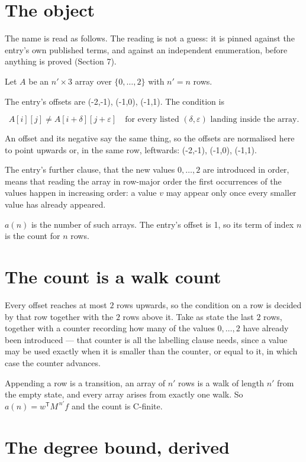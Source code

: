\documentclass[11pt]{article}
\theoremstyle{definition}
\begin{document}
\section{The object}

The name is read as follows. The reading is not a guess: it is pinned against the entry's own published terms, and against an independent enumeration, before anything is proved (Section 7).

Let $A$ be an $n' \times 3$ array over $\{0,\dots,2\}$ with $n' = n$ rows.

The entry's offsets are (-2,-1), (-1,0), (-1,1). The condition is

\[A[i][j] \ne A[i{+}\delta][j{+}\varepsilon]\quad\text{for every listed }(\delta,\varepsilon)\text{ landing inside the array.}\]

An offset and its negative say the same thing, so the offsets are normalised here to point upwards or, in the same row, leftwards: (-2,-1), (-1,0), (-1,1).

The entry's further clause, that the new values $0,\dots,2$ are introduced in order, means that reading the array in row-major order the first occurrences of the values happen in increasing order: a value $v$ may appear only once every smaller value has already appeared.

$a(n)$ is the number of such arrays. The entry's offset is 1, so its term of index $n$ is the count for $n$ rows.

\section{The count is a walk count}

Every offset reaches at most $2$ rows upwards, so the condition on a row is decided by that row together with the $2$ rows above it. Take as state the last $2$ rows, together with a counter recording how many of the values $0,\dots,2$ have already been introduced --- that counter is all the labelling clause needs, since a value may be used exactly when it is smaller than the counter, or equal to it, in which case the counter advances.

Appending a row is a transition, an array of $n'$ rows is a walk of length $n'$ from the empty state, and every array arises from exactly one walk. So $a(n) = w^{\mathsf T}M^{\,n'}f$ and the count is C-finite.

\section{The degree bound, derived}
\end{document}
